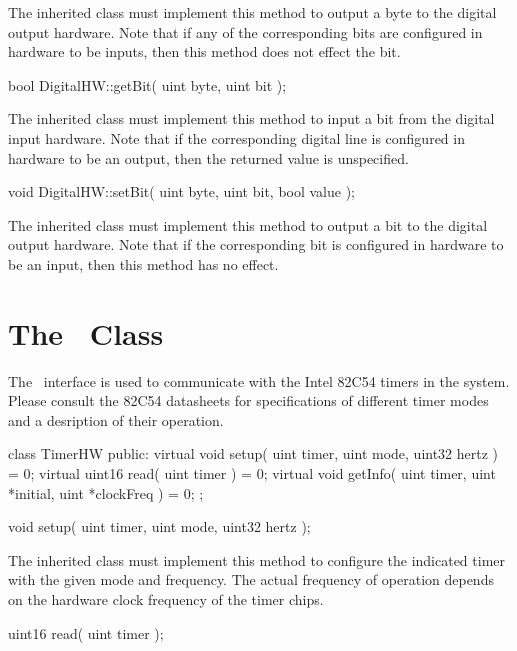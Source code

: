 The inherited class must implement this method to output a byte to the
digital output hardware. Note that if any of the corresponding bits are
configured in hardware to be inputs, then this method does not effect the
bit.

\begin{prototype}
bool DigitalHW::getBit( uint byte, uint bit );
\end{prototype}

The inherited class must implement this method to input a bit from the
digital input hardware. Note that if the corresponding digital line is
configured in hardware to be an output, then the returned value is
unspecified.

\begin{prototype}
void DigitalHW::setBit( uint byte, uint bit, bool value );
\end{prototype}

The inherited class must implement this method to output a bit to the
digital output hardware. Note that if the corresponding bit is configured in
hardware to be an input, then this method has no effect.

\section{The \TimerHW\ Class}
\label{sec:timer_class}

The \TimerHW\ interface is used to communicate with the Intel 82C54 timers
in the system. Please consult the 82C54 datasheets for specifications of
different timer modes and a desription of their operation.

\begin{classdef}
class TimerHW {
public:
  virtual void   setup( uint timer, uint mode, uint32 hertz ) = 0;
  virtual uint16 read( uint timer ) = 0;
  virtual void   getInfo( uint timer, uint *initial, uint *clockFreq ) = 0;
};
\end{classdef}

\begin{prototype}
void setup( uint timer, uint mode, uint32 hertz );
\end{prototype}

The inherited class must implement this method to configure the indicated
timer with the given mode and frequency. The actual frequency of operation
depends on the hardware clock frequency of the timer chips.

\begin{prototype}
uint16 read( uint timer );
\end{prototype}

